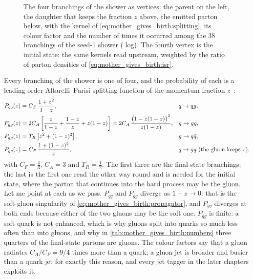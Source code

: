 \begin{figure}[htbp]\centering
\resizebox{\textwidth}{!}{}
\caption[The four branchings of the shower as vertices, with their kernels and their counts in our event]{The four branchings of the shower as vertices: the parent on the left, the daughter that keeps the fraction $z$ above, the emitted parton below, with the kernel of \cref{eq:mother_gives_birth:splitting}, its colour factor and the number of times it occurred among the $38$ branchings of the seed-1 shower ( log). The fourth vertex is the initial state: the same kernels read upstream, weighted by the ratio of parton densities of \cref{eq:mother_gives_birth:isr}.}
\label{fig:mother_gives_birth:splittings_sketch}
\end{figure}

Every branching of the shower is one of four, and the probability of each is
a leading-order Altarelli--Parisi splitting function of the momentum fraction
$z$~\cite{ParticleDataGroup:2024cfk}:
\begin{align}
  P_{qq}(z)&=C_F\,\frac{1+z^2}{1-z}, & &q\to qg, \notag\\
  P_{gg}(z)&=2C_A\left[\frac{z}{1-z}+\frac{1-z}{z}+z(1-z)\right]
            =2C_A\,\frac{\bigl(1-z(1-z)\bigr)^2}{z(1-z)}, & &g\to gg, \notag\\
  P_{qg}(z)&=T_R\left[z^2+(1-z)^2\right], & &g\to q\bar q, \label{eq:mother_gives_birth:splitting}\\
  P_{gq}(z)&=C_F\,\frac{1+(1-z)^2}{z}, & &q\to gq\ (\text{the gluon keeps }z), \notag
\end{align}
with $C_F=\tfrac43$, $C_A=3$ and $T_R=\tfrac12$. The first three are the
final-state branchings; the last is the first one read the other way round
and is needed for the initial state, where the parton that continues into the
hard process may be the gluon. Let me point at each as we pass. $P_{qq}$ and
$P_{gg}$ diverge as $1-z\to0$: that is the soft-gluon singularity of
\cref{eq:mother_gives_birth:propagator}, and $P_{gg}$ diverges at both ends
because either of the two gluons may be the soft one. $P_{qg}$ is finite:
a soft quark is not enhanced, which is why gluons split into quarks so much
less often than into gluons, and why in \cref{tab:mother_gives_birth:numbers}
three quarters of the final-state partons are gluons. The colour factors say
that a gluon radiates $C_A/C_F=9/4$ times more than a quark; a gluon jet is
broader and busier than a quark jet for exactly this reason, and every jet
tagger in the later chapters exploits it.

